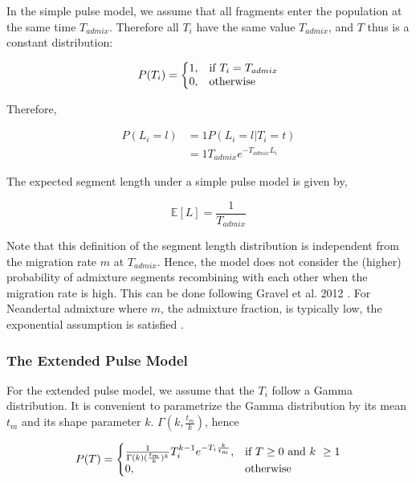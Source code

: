 \documentclass[]{article}
\begin{document}
In the simple pulse model, we assume that all fragments enter the population at the same time $T_{admix}$. Therefore all $T_i$ have the same value $T_{admix}$, and $T$ thus is a constant distribution:

\begin{equation}
\label{eq:RV_simple_pulse}
  P(T_i)=\left\{
  \begin{array}{@{}ll@{}}
    1, & \text{if}\ T_i=T_{admix} \\
    0, & \text{otherwise}
  \end{array}\right.
\end{equation} 

Therefore,

\begin{equation}
\begin{split}
\label{eq:Likelihood_function_simple_pulse}
    P(L_i=l) &=  1  P(L_i=l | T_i=t) \\
    &= 1 T_{admix}e^{-T_{admix}L_i}
\end{split}
\end{equation}

The expected segment length under a simple pulse model is given by,

\begin{equation}
\label{eq:Expected_l_simple_pulse}
    \mathbb{E}[L]=\frac{1}{T_{admix}}
\end{equation}

Note that this definition of the segment length distribution is independent from the migration rate $m$ at $T_{admix}$. Hence, the model does not consider the (higher) probability of admixture segments recombining with each other when the migration rate is high. This can be done following Gravel et al. 2012 \citep{gravel_population_2012}. For Neandertal admixture where $m$, the admixture fraction, is typically low, the exponential assumption is satisfied \citep{liang_lengths_2014}.

\subsubsection{The Extended Pulse Model}\label{The Extended Pulse Model}

For the extended pulse model, we assume that the $T_i$ follow a Gamma distribution. It is convenient to parametrize the Gamma distribution by its mean $t_m$ and its shape parameter $k$.  $\Gamma(k,\frac{t_m}{k})$, hence

\begin{equation}
\label{eq:RV_extended_pulse}
  P(T)=\left\{
  \begin{array}{@{}ll@{}}
    \frac{1}{\Gamma(k)(\frac{t_m}{k})^k}T_i^{k-1}e^{-T_i\frac{k}{t_m}}, & \text{if}\ T\geq 0\ \text{and}\ k\ \geq 1\\
    0, & \text{otherwise}
  \end{array}\right.
\end{equation} 
\end{document}

